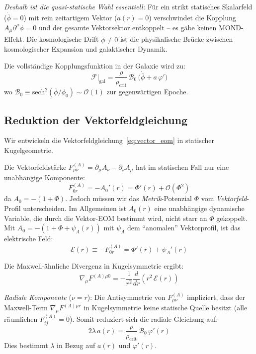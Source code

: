 \documentclass[aps,prd,twocolumn,superscriptaddress,nofootinbib]{revtex4-2}
\begin{document}
\textit{Deshalb ist die quasi-statische Wahl essentiell:} F\"ur ein strikt statisches Skalarfeld ($\dot{\bar{\phi}} = 0$) mit rein zeitartigem Vektor ($a(r) = 0$) verschwindet die Kopplung $A_\mu\partial^\mu\phi = 0$ und der gesamte Vektorsektor entkoppelt -- es g\"abe keinen MOND-Effekt. Die kosmologische Drift $\dot{\bar{\phi}} \neq 0$ ist die physikalische Br\"ucke zwischen kosmologischer Expansion und galaktischer Dynamik.

Die vollst\"andige Kopplungsfunktion in der Galaxie wird zu:
\begin{equation}
\mathcal{F}\big|_{\mathrm{gal}} = \frac{\rho}{\rho_{\mathrm{crit}}}\,\mathcal{B}_0\,\bigl(\dot{\bar{\phi}} + a\,\varphi'\bigr)
\label{eq:F_galaxy}
\end{equation}
wo $\mathcal{B}_0 \equiv \mathrm{sech}^2(\bar{\phi}/\phi_0) \sim \mathcal{O}(1)$ zur gegenw\"artigen Epoche.

\subsection{Reduktion der Vektorfeldgleichung}
\label{sec:vector_reduction}

Wir entwickeln die Vektorfeldgleichung~\eqref{eq:vector_eom} in statischer Kugelgeometrie.

Die Vektorfeldst\"arke $F^{(A)}_{\mu\nu} = \partial_\mu A_\nu - \partial_\nu A_\mu$ hat im statischen Fall nur eine unabh\"angige Komponente:
\begin{equation}
F^{(A)}_{0r} = -A_0'(r) = \Phi'(r) + \mathcal{O}(\Phi^2)
\label{eq:F0r}
\end{equation}
da $A_0 = -(1+\Phi)$. Jedoch m\"ussen wir das \textit{Metrik}-Potenzial $\Phi$ vom \textit{Vektorfeld}-Profil unterscheiden. Im Allgemeinen ist $A_0(r)$ eine unabh\"angige dynamische Variable, die durch die Vektor-EOM bestimmt wird, nicht starr an $\Phi$ gekoppelt. Mit $A_0 = -(1 + \Phi + \psi_A(r))$ mit $\psi_A$ dem ``anomalen'' Vektorprofil, ist das elektrische Feld:
\begin{equation}
\mathcal{E}(r) \equiv -F^{(A)}_{0r} = \Phi'(r) + \psi_A'(r)
\label{eq:E_field}
\end{equation}

Die Maxwell-\"ahnliche Divergenz in Kugelsymmetrie ergibt:
\begin{equation}
\nabla_\mu F^{(A)\mu 0} = -\frac{1}{r^2}\frac{d}{dr}\!\left(r^2\,\mathcal{E}(r)\right)
\label{eq:divE}
\end{equation}

\textit{Radiale Komponente} ($\nu = r$): Die Antisymmetrie von $F^{(A)}_{\mu\nu}$ impliziert, dass der Maxwell-Term $\nabla_\mu F^{(A)\mu r}$ in Kugelsymmetrie keine statische Quelle besitzt (alle r\"aumlichen $F^{(A)}_{ij} = 0$). Somit reduziert sich die radiale Gleichung auf:
\begin{equation}
2\lambda\,a(r) = \frac{\rho}{\rho_{\mathrm{crit}}}\,\mathcal{B}_0\,\varphi'(r)
\label{eq:radial_vec}
\end{equation}
Dies bestimmt $\lambda$ in Bezug auf $a(r)$ und $\varphi'(r)$.
\end{document}
